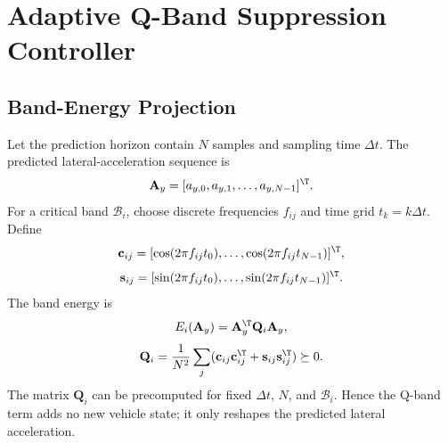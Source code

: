 \section{Adaptive Q-Band Suppression Controller}

\subsection{Band-Energy Projection}
Let the prediction horizon contain $N$ samples and sampling time $\Delta t$. The predicted lateral-acceleration sequence is
\begin{equation}
    \mathbf{A}_y=[a_{y,0},a_{y,1},\ldots,a_{y,N-1}]^\T .
\end{equation}
For a critical band $\mathcal{B}_i$, choose discrete frequencies $f_{ij}$ and time grid $t_k=k\Delta t$. Define
\begin{equation}
    \mathbf{c}_{ij}=[\cos(2\pi f_{ij}t_0),\ldots,\cos(2\pi f_{ij}t_{N-1})]^\T ,
\end{equation}
\begin{equation}
    \mathbf{s}_{ij}=[\sin(2\pi f_{ij}t_0),\ldots,\sin(2\pi f_{ij}t_{N-1})]^\T .
\end{equation}
The band energy is
\begin{equation}
    E_i(\mathbf{A}_y)=\mathbf{A}_y^\T\mathbf{Q}_i\mathbf{A}_y,
\end{equation}
\begin{equation}
    \mathbf{Q}_i=\frac{1}{N^2}\sum_j(\mathbf{c}_{ij}\mathbf{c}_{ij}^\T+\mathbf{s}_{ij}\mathbf{s}_{ij}^\T)\succeq0 .
\end{equation}
The matrix $\mathbf{Q}_i$ can be precomputed for fixed $\Delta t$, $N$, and $\mathcal{B}_i$. Hence the Q-band term adds no new vehicle state; it only reshapes the predicted lateral acceleration.

